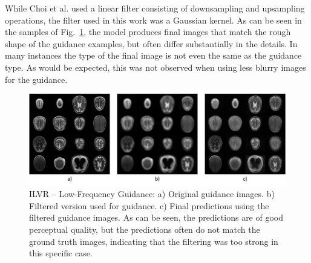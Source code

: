 While Choi et al. used a linear filter consisting of downsampling and upsampling operations, the filter used in this work was a Gaussian kernel. As can be seen in the samples of Fig.~\ref{fig:ilvr}, the model produces final images that match the rough shape of the guidance examples, but often differ substantially in the details. In many instances the type of the final image is not even the same as the guidance type. As would be expected, this was not observed when using less blurry images for the guidance.

\begin{figure}[h]
    \centering
    \includegraphics[width=.6\textwidth]{images/ilvr.png}
    \caption[ILVR -- Low-Frequency Guidance]{ILVR -- Low-Frequency Guidance: a) Original guidance images. b) Filtered version used for guidance. c) Final predictions using the filtered guidance images. As can be seen, the predictions are of good perceptual quality, but the predictions often do not match the ground truth images, indicating that the filtering was too strong in this specific case.}
    \label{fig:ilvr}
\end{figure}

